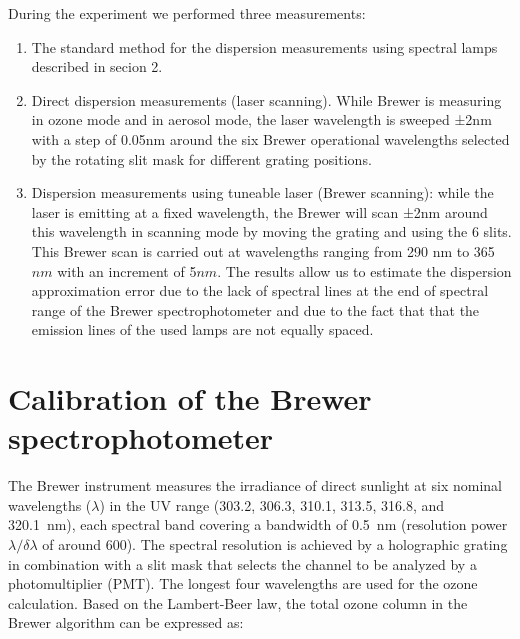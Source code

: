\documentclass[acp]{copernicus} %
\begin{document}

During the experiment we performed three measurements: 
\begin{enumerate}


\item The standard method for the dispersion measurements using spectral lamps described in secion 2.

\item  Direct dispersion measurements (laser scanning). 
While Brewer is measuring in ozone mode and in aerosol mode, the laser wavelength is sweeped ±2\unit{nm} with a step of 0.05\unit{nm} around the six Brewer operational wavelengths selected by the rotating slit mask for different grating positions.



\item  Dispersion measurements using tuneable laser (Brewer scanning): while the laser is emitting at a fixed wavelength, the Brewer will scan ±2\unit{nm} around this wavelength in scanning mode by moving the grating and using the 6 slits. This Brewer scan is carried out at wavelengths ranging from 290 \unit{nm} to 365 $\unit{nm}$ with an increment of 5$\unit{nm}$.  The results allow us to estimate the dispersion approximation error due to the lack of spectral lines at the end of spectral range of the Brewer spectrophotometer and due to the fact that that the emission lines of the used lamps are not equally spaced.

\end{enumerate}







\section{Calibration of the Brewer spectrophotometer}
\label{sec:calibration}


The Brewer instrument measures the irradiance of direct sunlight at six nominal wavelengths ($\lambda$) in the UV range (303.2, 306.3, 310.1, 313.5, 316.8, and 320.1~\unit{nm}), each spectral band covering a bandwidth of 0.5~\unit{nm} (resolution power $\lambda/\delta\lambda$ of around 600). The spectral resolution is achieved by a holographic grating in combination with a slit mask that selects the channel to be analyzed by a photomultiplier (PMT). The longest four wavelengths are used for the ozone calculation. Based on the Lambert-Beer law, the total ozone column in the Brewer algorithm can be expressed as:
\end{document}
